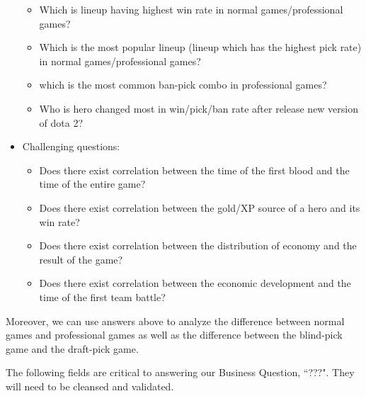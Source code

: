 \documentclass{article}
\begin{document}
\begin{itemize}
\begin{itemize}
        \item Which is lineup having highest win rate in normal games/professional games?
        \item Which is the most popular lineup (lineup which has the highest pick rate) in normal games/professional games?
        \item which is the most common ban-pick combo in professional games?
        \item Who is hero changed most in win/pick/ban rate after release new version of dota 2?
    \end{itemize}
    \item Challenging questions:
    \begin{itemize}
        \item Does there exist correlation between the time of the first blood and the time of the entire game?
        \item Does there exist correlation between the gold/XP source of a hero and its win rate?
        \item Does there exist correlation between the distribution of economy and the result of the game?
        \item Does there exist correlation between the economic development and the time of the first team battle?
    \end{itemize}
\end{itemize}
Moreover, we can use answers above to analyze the difference between normal games and professional games as well as the difference between the blind-pick game and the draft-pick game.


The following fields are critical to answering our Business Question, ``???".
They will need to be cleansed and validated.





\end{document}
